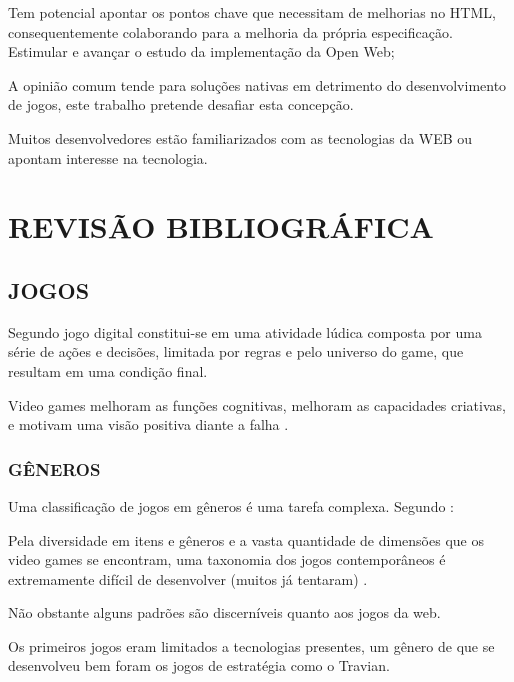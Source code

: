 \documentclass[
12pt,
a4paper,
portuges,
draft
]{report}
\renewenvironment{quote}
               {\list{}{\rightmargin\leftmargin}%
                \item\relax\fontsize{10}{12}}
               {\endlist}
\begin{document}
Tem potencial apontar os pontos chave que necessitam
de melhorias no HTML, consequentemente colaborando para a
melhoria da própria especificação.
Estimular e avançar o estudo da implementação da Open Web;

A opinião comum tende para soluções nativas em detrimento do
desenvolvimento de jogos, este trabalho pretende desafiar esta
concepção. %

Muitos desenvolvedores estão familiarizados
com as tecnologias da WEB ou apontam interesse na tecnologia.



\chapter{REVISÃO BIBLIOGRÁFICA}

\section{JOGOS}
Segundo \autocite{indieGamesLemes} jogo digital constitui-se em uma
atividade lúdica composta por uma série de ações e decisões,
limitada por regras e pelo universo do game, que resultam em uma
condição final.

Video games melhoram as funções cognitivas, melhoram as capacidades criativas, e
motivam uma visão positiva diante a falha \autocite{gamebenefits}.


\subsection{GÊNEROS}

Uma classificação de jogos em gêneros é uma tarefa complexa. Segundo \autocite{gamebenefits}:

\begin{quote}
Pela diversidade  em itens e gêneros e a vasta quantidade de dimensões que os video games se encontram, uma taxonomia dos jogos contemporâneos é extremamente difícil de desenvolver (muitos já tentaram) .
\end{quote}


Não obstante alguns padrões são discerníveis quanto aos jogos da web.


Os primeiros jogos eram limitados a tecnologias presentes, um gênero de que se desenvolveu bem foram os jogos
de estratégia como o Travian.
\end{document}
